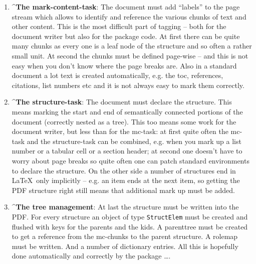 \documentclass[DIV=12,parskip=half-,bibliography=totoc]{scrartcl}
\newcommand\PDF{PDF}
\begin{document}
\begin{enumerate}
\item
  \TagP^\textbf{The mark-content-task}: The document must add \enquote{labels} to the page stream which allows to identify and reference the various chunks of text and other content.  This is the most difficult part of tagging -- both for the document writer but also for the package code. At first there can be quite many chunks as every one is a leaf node of the structure and so often a rather small unit.  At second the chunks must be defined page-wise -- and this is not easy when you don't know where the page breaks are. Also in a standard document a lot text is created automatically, e.g. the toc, references, citations, list numbers etc and it is not always easy to mark them correctly.\Pmeti

\item
  \TagP^\textbf{The structure-task}:  The document must declare the structure. This means marking the start and end of semantically connected portions of the document (correctly nested as a tree). This too means some work for the document writer, but less than for the mc-task: at first quite often the mc-task and the structure-task can be combined, e.g. when you mark up a list number or a tabular cell or a section header; at second one doesn't have to worry about page breaks so quite often one can patch standard environments to declare the structure. On the other side a number of structures end in \LaTeX\ only implicitly -- e.g. an item ends at the next item, so getting the \PDF{} structure right still means that additional mark up must be added.
  \Pmeti

\item
 \TagP^\textbf{The tree management}: At last the structure must be written into the \PDF{}. For every structure an object of type \texttt{StructElem} must be  created and flushed with keys for the parents and the kids. A parenttree must be created to get a reference from the mc-chunks to the parent structure. A rolemap must be written. And a number of dictionary entries. All this is hopefully done automatically and correctly by the package \ldots.
 \Pmeti
\end{enumerate}
\end{document}
